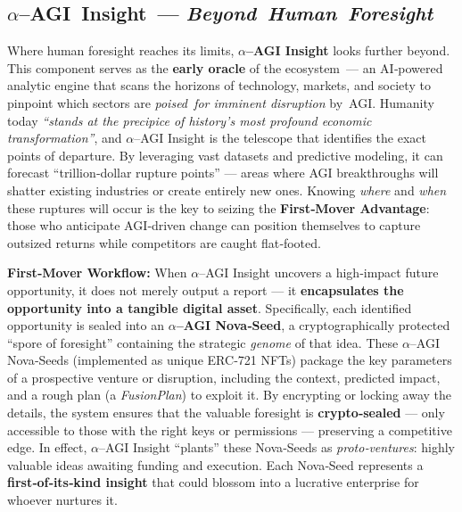 \documentclass[12pt]{article}
\theoremstyle{plain}
\newcommand{\pdfmath}[2]{\texorpdfstring{$#1$}{#2}}
\newcommand{\AGIalpha}{\pdfmath{\alpha}{alpha}\nobreakdash--AGI\xspace}
\begin{document}
\subsection{\texorpdfstring{\AGIalpha{} Insight — \textit{Beyond Human Foresight}}%
                           {alpha‑AGI Insight — Beyond Human Foresight}}
Where human foresight reaches its limits, \textbf{\AGIalpha Insight} looks
further beyond.  This component serves as the \textbf{early oracle} of the
ecosystem — an AI‑powered analytic engine that scans the horizons of
technology, markets, and society to pinpoint which sectors are
\textit{poised for imminent disruption} by AGI.  Humanity today
\textit{“stands at the precipice of history’s most profound economic
transformation”}, and \AGIalpha Insight is the telescope that identifies the
exact points of departure.  By leveraging vast datasets and predictive
modeling, it can forecast “trillion‑dollar rupture points” — areas where AGI
breakthroughs will shatter existing industries or create entirely new ones.
Knowing \textit{where} and \textit{when} these ruptures will occur is the key
to seizing the \textbf{First‑Mover Advantage}: those who anticipate AGI‑driven
change can position themselves to capture outsized returns while competitors
are caught flat‑footed.

\textbf{First‑Mover Workflow:} When \AGIalpha Insight uncovers a high‑impact
future opportunity, it does not merely output a report — it
\textbf{encapsulates the opportunity into a tangible digital asset}.
Specifically, each identified opportunity is sealed into an
\textbf{\AGIalpha Nova‑Seed}, a cryptographically protected “spore of
foresight” containing the strategic \textit{genome} of that idea.  These
\AGIalpha Nova‑Seeds (implemented as unique ERC‑721 NFTs) package the key
parameters of a prospective venture or disruption, including the context,
predicted impact, and a rough plan (a \textit{FusionPlan}) to exploit it.  By
encrypting or locking away the details, the system ensures that the valuable
foresight is \textbf{crypto‑sealed} — only accessible to those with the right
keys or permissions — preserving a competitive edge.  In effect,
\AGIalpha Insight “plants” these Nova‑Seeds as \textit{proto‑ventures}: highly
valuable ideas awaiting funding and execution.  Each Nova‑Seed represents a
\textbf{first‑of‑its‑kind insight} that could blossom into a lucrative
enterprise for whoever nurtures it.
\end{document}
